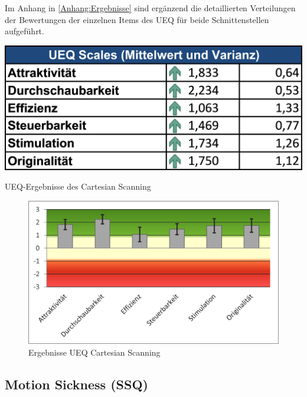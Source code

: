 Im Anhang in \autoref{Anhang:Ergebnisse} sind ergänzend die detaillierten Verteilungen der Bewertungen der einzelnen Items des UEQ für beide Schnittenstellen aufgeführt. 

\begin{table}[tbh]
    \centering
    \includegraphics{images/Results/UEQ-Table-Means-Cartesian.png}
    \caption{UEQ-Ergebnisse des Cartesian Scanning}
    \label{tab:ueqScalesCartesian}
\end{table}

\begin{figure}[tbh]
    \centering
    \includegraphics{images/Results/UEQ-Cartesian.png}
    \caption{Ergebnisse UEQ Cartesian Scanning}
    \label{fig:ueqScoreCartesian}
\end{figure}


\subsection{Motion Sickness (SSQ)} 

